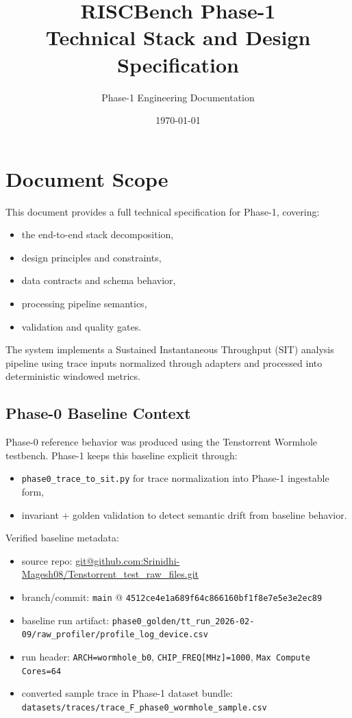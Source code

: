 \documentclass[11pt,a4paper]{article}
\title{RISCBench Phase-1\\Technical Stack and Design Specification}
\author{Phase-1 Engineering Documentation}
\date{\today}
\begin{document}
\maketitle
\tableofcontents
\newpage

\section{Document Scope}
This document provides a full technical specification for Phase-1, covering:
\begin{itemize}[leftmargin=1.4em]
  \item the end-to-end stack decomposition,
  \item design principles and constraints,
  \item data contracts and schema behavior,
  \item processing pipeline semantics,
  \item validation and quality gates.
\end{itemize}

The system implements a Sustained Instantaneous Throughput (SIT) analysis pipeline using trace inputs normalized through adapters and processed into deterministic windowed metrics.

\subsection{Phase-0 Baseline Context}
Phase-0 reference behavior was produced using the Tenstorrent Wormhole testbench. Phase-1 keeps this baseline explicit through:
\begin{itemize}[leftmargin=1.4em]
  \item \texttt{phase0\_trace\_to\_sit.py} for trace normalization into Phase-1 ingestable form,
  \item invariant + golden validation to detect semantic drift from baseline behavior.
\end{itemize}
\noindent Verified baseline metadata:
\begin{itemize}[leftmargin=1.4em]
  \item source repo: \url{git@github.com:Srinidhi-Magesh08/Tenstorrent_test_raw_files.git}
  \item branch/commit: \texttt{main} @ \texttt{4512ce4e1a689f64c866160bf1f8e7e5e3e2ec89}
  \item baseline run artifact: \texttt{phase0\_golden/tt\_run\_2026-02-09/raw\_profiler/profile\_log\_device.csv}
  \item run header: \texttt{ARCH=wormhole\_b0}, \texttt{CHIP\_FREQ[MHz]=1000}, \texttt{Max Compute Cores=64}
  \item converted sample trace in Phase-1 dataset bundle: \texttt{datasets/traces/trace\_F\_phase0\_wormhole\_sample.csv}
\end{itemize}
\end{document}
